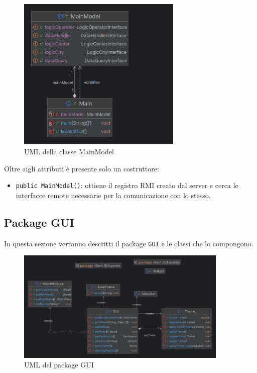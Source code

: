 \begin{figure}[H]
    \centering
    \includegraphics[width=0.7\textwidth]{img/mainModelUML.png}
    \caption{UML della classe MainModel}
    \label{fig:UMLMainModel}
\end{figure}
Oltre aigli attributi è presente solo un costruttore:
\begin{itemize}
    \item \texttt{public MainModel()}: ottiene il registro RMI creato dal server e cerca le interfacce remote necessarie per la comunicazione con lo stesso.
\end{itemize}

\subsection{Package GUI}
In questa sezione verranno descritti il package \texttt{GUI} e le classi che lo compongono.\\

\begin{figure}[H]
    \centering
    \includegraphics[width=0.9\textwidth]{img/guiPackage.png}
    \caption{UML del package GUI}
    \label{fig:UMLGUI} 
\end{figure}

